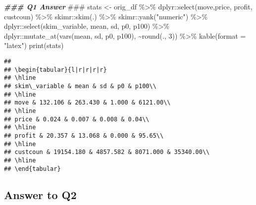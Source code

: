 \documentclass[
]{article}
\newenvironment{Shaded}{\begin{snugshade}}{\end{snugshade}}
\newcommand{\AlertTok}[1]{\textcolor[rgb]{0.94,0.16,0.16}{#1}}
\newcommand{\AttributeTok}[1]{\textcolor[rgb]{0.77,0.63,0.00}{#1}}
\newcommand{\DecValTok}[1]{\textcolor[rgb]{0.00,0.00,0.81}{#1}}
\newcommand{\DocumentationTok}[1]{\textcolor[rgb]{0.56,0.35,0.01}{\textbf{\textit{#1}}}}
\newcommand{\FunctionTok}[1]{\textcolor[rgb]{0.00,0.00,0.00}{#1}}
\newcommand{\NormalTok}[1]{#1}
\newcommand{\OtherTok}[1]{\textcolor[rgb]{0.56,0.35,0.01}{#1}}
\newcommand{\SpecialCharTok}[1]{\textcolor[rgb]{0.00,0.00,0.00}{#1}}
\newcommand{\StringTok}[1]{\textcolor[rgb]{0.31,0.60,0.02}{#1}}
\begin{document}
\begin{Shaded}
\begin{Highlighting}[]
\DocumentationTok{\#\#\# Q1 Answer }\AlertTok{\#\#\#}
\NormalTok{stats }\OtherTok{\textless{}{-}}\NormalTok{ orig\_df }\SpecialCharTok{\%\textgreater{}\%}
\NormalTok{  dplyr}\SpecialCharTok{::}\FunctionTok{select}\NormalTok{(move,price, profit, custcoun) }\SpecialCharTok{\%\textgreater{}\%}
\NormalTok{  skimr}\SpecialCharTok{::}\FunctionTok{skim}\NormalTok{(.) }\SpecialCharTok{\%\textgreater{}\%}
\NormalTok{  skimr}\SpecialCharTok{::}\FunctionTok{yank}\NormalTok{(}\StringTok{"numeric"}\NormalTok{) }\SpecialCharTok{\%\textgreater{}\%}
\NormalTok{  dplyr}\SpecialCharTok{::}\FunctionTok{select}\NormalTok{(skim\_variable, mean, sd, p0, p100) }\SpecialCharTok{\%\textgreater{}\%}
\NormalTok{  dplyr}\SpecialCharTok{::}\FunctionTok{mutate\_at}\NormalTok{(}\FunctionTok{vars}\NormalTok{(mean, sd, p0, p100), }\SpecialCharTok{\textasciitilde{}}\FunctionTok{round}\NormalTok{(., }\DecValTok{3}\NormalTok{)) }\SpecialCharTok{\%\textgreater{}\%}
  \FunctionTok{kable}\NormalTok{(}\AttributeTok{format =} \StringTok{"latex"}\NormalTok{)}
\FunctionTok{print}\NormalTok{(stats)}
\end{Highlighting}
\end{Shaded}

\begin{verbatim}
## 
## \begin{tabular}{l|r|r|r|r}
## \hline
## skim\_variable & mean & sd & p0 & p100\\
## \hline
## move & 132.106 & 263.430 & 1.000 & 6121.00\\
## \hline
## price & 0.024 & 0.007 & 0.008 & 0.04\\
## \hline
## profit & 20.357 & 13.068 & 0.000 & 95.65\\
## \hline
## custcoun & 19154.180 & 4857.582 & 8071.000 & 35340.00\\
## \hline
## \end{tabular}
\end{verbatim}

\hypertarget{answer-to-q2}{%
\subsection{Answer to Q2}\label{answer-to-q2}}
\end{document}
